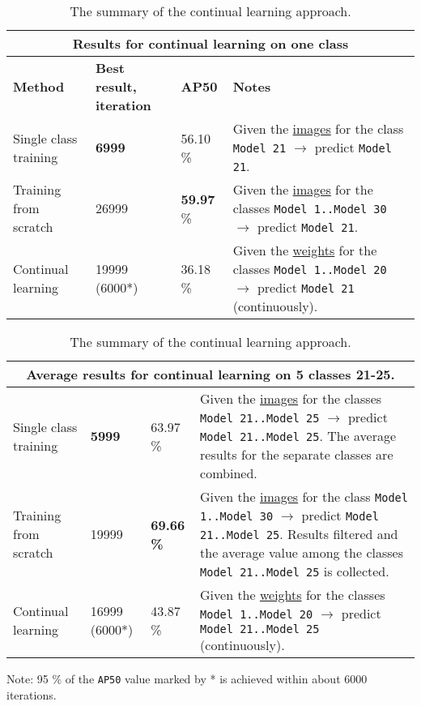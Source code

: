 \begin{table}
\centering
\caption{The summary of the continual learning approach.}\label{summary_table_2} 
\begin{tabularx}{\textwidth}{|p{1.5cm}|p{1.5cm}|p{1.5cm}|X|} 
 \hline
\multicolumn{4}{c}{\textbf{Results for continual learning on one class}} \\ \hline
\textbf{Method} & \textbf{Best result, iteration} & \textbf{AP50} & \textbf{Notes} \\
\hline
Single class training & \textbf{6999} & 56.10 \% & \multicolumn{1}{m{9cm}|}{Given the \uline{images} for the class \texttt{Model 21} $\rightarrow$ predict \texttt{Model 21}.} \\ 
\hline
Training from scratch  & 26999 & \textbf{59.97} \% & \multicolumn{1}{m{9cm}|}{Given the \uline{images} for the classes \texttt{Model 1..Model 30} $\rightarrow$ predict \texttt{Model 21}.} \\ 
\hline
Continual learning & 19999 (6000*) & 36.18 \% & \multicolumn{1}{m{9cm}|}{Given the \uline{weights} for the classes  \texttt{Model 1..Model 20} $\rightarrow$ predict \texttt{Model 21} (continuously).} \\ 
\hline  
\end{tabularx} 
\begin{tabularx}{\textwidth}{|p{1.5cm}|p{1.5cm}|p{1.5cm}|X|} 
\multicolumn{4}{c}{\textbf{Average results for continual learning on 5 classes 21-25}.} \\ 
\hline
Single class training  & \textbf{5999} & 63.97 \% & \multicolumn{1}{m{9cm}|}{Given the \uline{images} for the classes \texttt{Model 21..Model 25} $\rightarrow$ predict \texttt{Model 21..Model 25}. The average results for the  separate classes are combined.} \\ 
\hline
Training from scratch & 19999 & \textbf{69.66 \%} & \multicolumn{1}{m{9cm}|}{Given the \uline{images} for the class \texttt{Model 1..Model 30} $\rightarrow$ predict \texttt{Model 21..Model 25}. Results filtered and the average value among the classes \texttt{Model 21..Model 25} is collected.} \\ 
\hline
Continual learning & 16999 (6000*) & 43.87 \% & \multicolumn{1}{m{9cm}|}{Given the \uline{weights} for the classes \texttt{Model 1..Model 20} $\rightarrow$ predict \texttt{Model 21..Model 25} (continuously). } \\ 
\hline      
\end{tabularx}
\begin{tablenotes}
\small
\item Note: 95 \% of the \texttt{AP50} value marked by * is achieved within about 6000 iterations.
\end{tablenotes}
\end{table}

